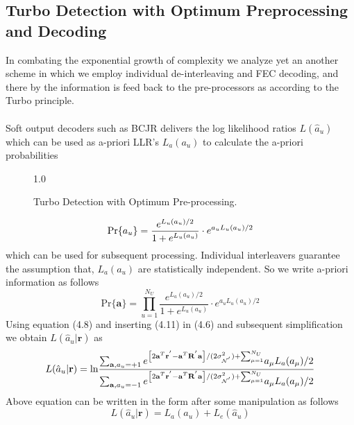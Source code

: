 \subsection{Turbo Detection with Optimum Preprocessing and Decoding}
In combating the exponential growth of complexity we analyze yet an another scheme in which we employ individual de-interleaving and FEC decoding, and there by the information is feed back to the pre-processors as according to the Turbo principle. \\ \\
Soft output decoders such as BCJR \cite{BCJR} delivers the log likelihood ratios $L(\hat{a}_u)$ which can be used as a-priori LLR's $L_a(a_u)$ to calculate the a-priori probabilities
\begin{figure}[htb]
\centerline{  {1.0} }
\caption{Turbo Detection with Optimum Pre-processing.}
\end{figure}
\begin{equation}
\mathrm{Pr}\{a_u\}=\frac{\hbox{$e^{L_u(a_u)/2}$}}{\hbox{$1+e^{L_u(a_u)}$}}\cdot e^{a_uL_u(a_u)/2}
\end{equation}
which can be used for subsequent processing. Individual interleavers guarantee the assumption that, $L_a(a_u)$ are statistically independent. So we write a-priori information as follows
\begin{equation}
\mathrm{Pr}\{\mathrm{\mathbf{a}}\}=\prod\limits_{u=1}^{N_U}\frac{e^{L_a(a_u)/2}}{1+e^{L_u(a_u)}}\cdot e^{a_uL_u(a_u)/2}
\end{equation}
Using equation (4.8) and inserting (4.11) in (4.6) and subsequent simplification we obtain $L(\hat{a}_u\vert \mathrm{\mathbf{r}})$ as
\begin{equation}
L(\hat{a}_u\vert \mathrm{\mathbf{r}})=
\mathrm{ln}
\frac
{
\hbox{$\sum_{\mathrm{\mathbf{a}},a_u=+1}e^{\left[2\mathrm{\mathbf{a}}^T\mathrm{\mathbf{r}}^{'}-\mathrm{\mathbf{a}}^{T}\mathrm{\mathbf{R}}^{'}\mathrm{\mathbf{a}}\right]/(2\sigma^2_{\mathcal{N}^{'}})+\sum_{\mu = 1}^{N_U}}a_{\mu}L_a(a_{\mu})/2$}
}
{
\hbox{$\sum_{\mathrm{\mathbf{a}},a_u=-1}e^{\left[2\mathrm{\mathbf{a}}^T\mathrm{\mathbf{r}}^{'}-\mathrm{\mathbf{a}}^{T}\mathrm{\mathbf{R}}^{'}\mathrm{\mathbf{a}}\right]/(2\sigma^2_{\mathcal{N}^{'}})+\sum_{\mu = 1}^{N_U}}a_{\mu}L_a(a_{\mu})/2$}
}
\end{equation}
Above equation can be written in the form after some manipulation as follows
\begin{equation}
L(\hat{a}_u\vert \mathrm{\mathbf{r}})=L_a(a_u)+L_e(\hat{a}_u)
\end{equation}
